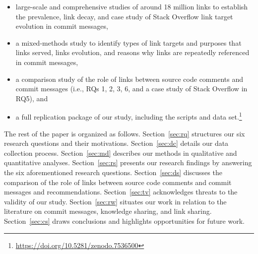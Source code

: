 \documentclass[smallextended]{svjour3}       %
\newcommand{\fix}[1]{\textcolor{black}{#1}}
\begin{document}
\begin{itemize}
    \item large-scale and comprehensive studies of around 18 million links to establish the prevalence, link decay, and case study of Stack Overflow link target evolution in commit messages,
    \item a mixed-methods study to identify types of link targets and purposes that links served, links evolution, and reasons why links are repeatedly referenced in commit messages,
    \item a comparison study of the role of links between source code comments and commit messages (i.e., RQs 1, 2, 3, 6, and a case study of Stack Overflow in RQ5), and
    \item a full replication package of our study, including the scripts and data set.\footnote{\url{https://doi.org/10.5281/zenodo.7536500}}
    
\end{itemize}

The rest of the paper is organized as follows. Section~\ref{sec:rq} structures our six research questions and their motivations. Section~\ref{sec:dc} details our data collection process. Section~\ref{sec:md} describes our methods in qualitative and quantitative analyses. Section~\ref{sec:rs} presents our research findings by answering the six aforementioned research questions. Section~\ref{sec:ds} discusses the comparison of the role of links between source code comments and commit messages and recommendations. 
Section~\ref{sec:tv} acknowledges threats to the validity of our study.
Section~\ref{sec:rw} situates
our work in relation to the literature on commit messages, knowledge sharing, and link sharing. 
Section~\ref{sec:cs} draws conclusions and highlights opportunities for future work.


\end{document}
